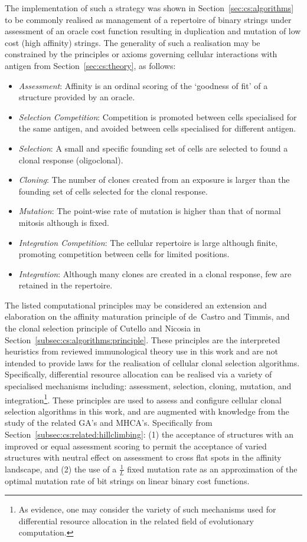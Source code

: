 The implementation of such a strategy was shown in Section~\ref{sec:cs:algorithms} to be commonly realised as management of a repertoire of binary strings under assessment of an oracle cost function resulting in duplication and mutation of low cost (high affinity) strings. The generality of such a realisation may be constrained by the principles or axioms governing cellular interactions with antigen from Section~\ref{sec:cs:theory}, as follows: 

\begin{itemize}	
	\item \emph{Assessment}: Affinity is an ordinal scoring of the `goodness of fit' of a structure provided by an oracle.
	\item \emph{Selection Competition}: Competition is promoted between cells specialised for the same antigen, and avoided between cells specialised for different antigen.
	\item \emph{Selection}: A small and specific founding set of cells are selected to found a clonal response (oligoclonal).
	\item \emph{Cloning}: The number of clones created from an exposure is larger than the founding set of cells selected for the clonal response.
	\item \emph{Mutation}: The point-wise rate of mutation is higher than that of normal mitosis although is fixed.
	\item \emph{Integration Competition}: The cellular repertoire is large although finite, promoting competition between cells for limited positions.
	\item \emph{Integration}: Although many clones are created in a clonal response, few are retained in the repertoire.
\end{itemize}

The listed computational principles may be considered an extension and elaboration on the affinity maturation principle of de~Castro and Timmis, and the clonal selection principle of Cutello and Nicosia in Section~\ref{subsec:cs:algorithms:principle}. These principles are the interpreted heuristics from reviewed immunological theory use in this work and are not intended to provide laws for the realisation of cellular clonal selection algorithms. Specifically, differential resource allocation can be realised via a variety of specialised mechanisms including: assessment, selection, cloning, mutation, and integration\footnote{As evidence, one may consider the variety of such mechanisms used for differential resource allocation in the related field of evolutionary computation.}. These principles are used to assess and configure cellular clonal selection algorithms in this work, and are augmented with knowledge from the study of the related GA's and MHCA's. Specifically from Section~\ref{subsec:cs:related:hillclimbing}: (1) the acceptance of structures with an improved or equal assessment scoring to permit the acceptance of varied structures with neutral effect on assessment to cross flat spots in the affinity landscape, and (2) the use of a $\frac{1}{L}$ fixed mutation rate as an approximation of the optimal mutation rate of bit strings on linear binary cost functions.


